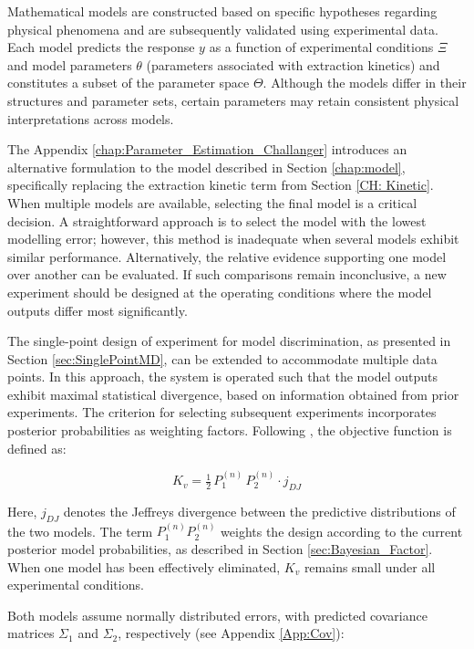 \documentclass[../Article_Design_of_Experiment.tex]{subfiles}
\begin{document}
	
	Mathematical models are constructed based on specific hypotheses regarding physical phenomena and are subsequently validated using experimental data. Each model predicts the response $y$ as a function of experimental conditions $\Xi$ and model parameters $\theta$ (parameters associated with extraction kinetics) and constitutes a subset of the parameter space $\Theta$. Although the models differ in their structures and parameter sets, certain parameters may retain consistent physical interpretations across models.
	
	The Appendix \ref{chap:Parameter_Estimation_Challanger} introduces an alternative formulation to the model described in Section \ref{chap:model}, specifically replacing the extraction kinetic term from Section \ref{CH: Kinetic}. When multiple models are available, selecting the final model is a critical decision. A straightforward approach is to select the model with the lowest modelling error; however, this method is inadequate when several models exhibit similar performance. Alternatively, the relative evidence supporting one model over another can be evaluated. If such comparisons remain inconclusive, a new experiment should be designed at the operating conditions where the model outputs differ most significantly. 
	
	The single-point design of experiment for model discrimination, as presented in Section \ref{sec:SinglePointMD}, can be extended to accommodate multiple data points. In this approach, the system is operated such that the model outputs exhibit maximal statistical divergence, based on information obtained from prior experiments. The criterion for selecting subsequent experiments incorporates posterior probabilities as weighting factors. Following \citet{Himmelblau1970}, the objective function is defined as:
	
	{\footnotesize
		\begin{equation}
			K_v = \tfrac{1}{2} \, P_1^{(n)} \, P_2^{(n)} \cdot j_{DJ}
			\label{eq:Kv}
	\end{equation}}
	
	Here, $j_{DJ}$ denotes the Jeffreys divergence between the predictive distributions of the two models. The term $P_1^{(n)} P_2^{(n)}$ weights the design according to the current posterior model probabilities, as described in Section \ref{sec:Bayesian_Factor}. When one model has been effectively eliminated, $K_v$ remains small under all experimental conditions.
	
	Both models assume normally distributed errors, with predicted covariance matrices $\Sigma_1$ and $\Sigma_2$, respectively (see Appendix \ref{App:Cov}):
	
\end{document}
